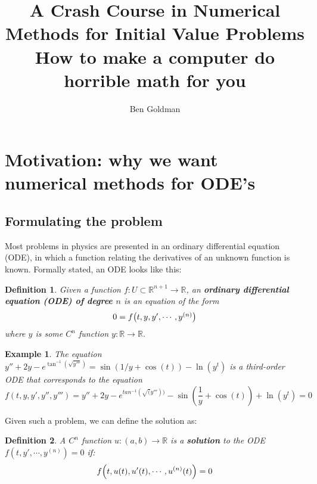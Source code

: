 \documentclass{article}
\title{A Crash Course in Numerical Methods for Initial Value Problems \\ \small{How to make a computer do horrible math for you}}
\author{Ben Goldman}
\newtheorem{definition}{Definition}[section]
\newtheorem{example}{Example}[section]
\newcommand{\R}{\mathbb{R}}
\newcommand{\0}{\vb{0}}
\begin{document}
\maketitle


\section{Motivation: why we want numerical methods for ODE's}

\subsection{Formulating the problem}

Most problems in physics are presented in an ordinary differential equation (ODE), in which a function relating the derivatives of an unknown function is known. Formally stated, an ODE looks like this:

\begin{definition}
  Given a function $f: U \subset \R^{n+1} \to \R$, an  \textbf{ordinary differential equation (ODE) of degree $n$} is an equation of the form
  \[0 = f\mqty(t, y, y', \cdots, y^{(n)})\]
  where $y$ is some $C^n$ function $y: \R\to\R$.
\end{definition}

\begin{example}
  The equation $y'' + 2y - e^{\tan^{-1}(\sqrt{y'''})} = \sin(1/y + \cos(t)) - \ln(y^t)$ is a third-order ODE that corresponds to the equation
  \[f(t, y, y', y'', y''') = y'' + 2y - e^{tan^{-1}(\sqrt(y'''))} - \sin(\frac{1}{y} + \cos(t)) + \ln(y^t) = 0\]
\end{example}

Given such a problem, we can define the solution as:
\begin{definition}
  A $C^n$ function $u: (a, b)\to\R$ is a \textbf{solution} to the ODE $f(t, y', \cdots, y^{(n)}) = 0$ if:
  \[f\qty(t, u(t), u'(t), \cdots, u^{(n)}(t)) = 0\]
\end{definition}
\end{document}
